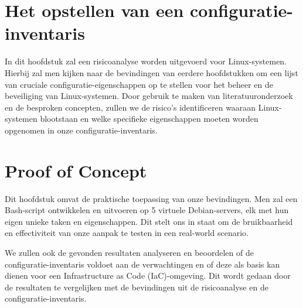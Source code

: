 \section{Het opstellen van een configuratie-inventaris}
\label{sec:risicoanalyse}
In dit hoofdstuk zal een risicoanalyse worden uitgevoerd voor Linux-systemen.
Hierbij zal men kijken naar de bevindingen van eerdere hoofdstukken om een lijst van cruciale configuratie-eigenschappen op te stellen voor het beheer en de beveiliging van Linux-systemen.
Door gebruik te maken van literatuuronderzoek en de besproken concepten, zullen we de risico's identificeren waaraan Linux-systemen blootstaan en welke specifieke eigenschappen moeten worden opgenomen in onze configuratie-inventaris.

\section{Proof of Concept}
\label{sec:proof-of-concept}
Dit hoofdstuk omvat de praktische toepassing van onze bevindingen.
Men zal een Bash-script ontwikkelen en uitvoeren op 5 virtuele Debian-servers, elk met hun eigen unieke taken en eigenschappen.
Dit stelt ons in staat om de bruikbaarheid en effectiviteit van onze aanpak te testen in een real-world scenario.

We zullen ook de gevonden resultaten analyseren en beoordelen of de configuratie-inventaris voldoet aan de verwachtingen en of deze als basis kan dienen voor een Infrastructure as Code (IaC)-omgeving.
Dit wordt gedaan door de resultaten te vergelijken met de bevindingen uit de risicoanalyse en de configuratie-inventaris.
